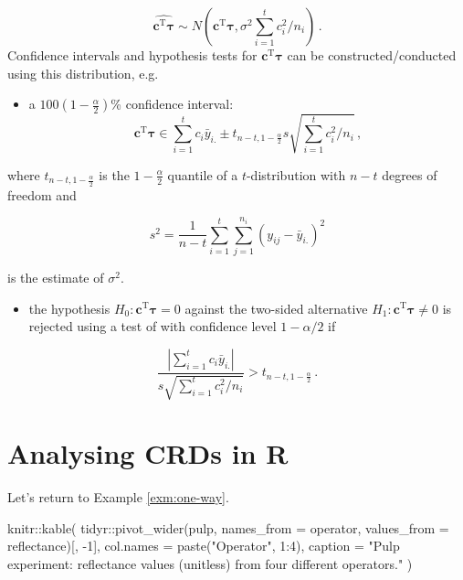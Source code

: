 \documentclass[
]{book}
\newenvironment{Shaded}{\begin{snugshade}}{\end{snugshade}}
\newcommand{\AttributeTok}[1]{\textcolor[rgb]{0.77,0.63,0.00}{#1}}
\newcommand{\DecValTok}[1]{\textcolor[rgb]{0.00,0.00,0.81}{#1}}
\newcommand{\FunctionTok}[1]{\textcolor[rgb]{0.00,0.00,0.00}{#1}}
\newcommand{\NormalTok}[1]{#1}
\newcommand{\SpecialCharTok}[1]{\textcolor[rgb]{0.00,0.00,0.00}{#1}}
\newcommand{\StringTok}[1]{\textcolor[rgb]{0.31,0.60,0.02}{#1}}
\providecommand{\tightlist}{%
  \setlength{\itemsep}{0pt}\setlength{\parskip}{0pt}}
\theoremstyle{definition}
\theoremstyle{definition}
\theoremstyle{definition}
\theoremstyle{definition}
\theoremstyle{remark}
\begin{document}
\[
\widehat{\boldsymbol{c}^{\mathrm{T}}\boldsymbol{\tau}} \sim N\left(\boldsymbol{c}^{\mathrm{T}}\boldsymbol{\tau}, \sigma^2\sum_{i=1}^tc_i^2/n_i\right)\,.
\]
Confidence intervals and hypothesis tests for \(\boldsymbol{c}^{\mathrm{T}}\boldsymbol{\tau}\) can be constructed/conducted using this distribution, e.g.

\begin{itemize}
\tightlist
\item
  a \(100(1-\frac{\alpha}{2})\)\% confidence interval:
  \[
   \boldsymbol{c}^{\mathrm{T}}\boldsymbol{\tau} \in \sum_{i=1}^tc_i\bar{y}_{i.} \pm t_{n-t, 1-\frac{\alpha}{2}}s\sqrt{\sum_{i=1}^tc_i^2/n_i}\,,
   \]
\end{itemize}

where \(t_{n-t, 1-\frac{\alpha}{2}}\) is the \(1-\frac{\alpha}{2}\) quantile of a \(t\)-distribution with \(n-t\) degrees of freedom and

\begin{equation} 
s^2 = \frac{1}{n-t}\sum_{i=1}^t\sum_{j=1}^{n_i}(y_{ij} - \bar{y}_{i.})^2
\label{eq:crd-s2}
\end{equation}

is the estimate of \(\sigma^2\).

\begin{itemize}
\tightlist
\item
  the hypothesis \(H_0: \boldsymbol{c}^{\mathrm{T}}\boldsymbol{\tau} = 0\) against the two-sided alternative \(H_1: \boldsymbol{c}^{\mathrm{T}}\boldsymbol{\tau} \ne 0\) is rejected using a test of with confidence level \(1-\alpha/2\) if
\end{itemize}

\[
 \frac{|\sum_{i=1}^tc_i\bar{y}_{i.}|}{s\sqrt{\sum_{i=1}^tc_i^2/n_i}} > t_{n-t, 1-\frac{\alpha}{2}}\,.
 \]

\hypertarget{r-crd}{%
\section{Analysing CRDs in R}\label{r-crd}}

Let's return to Example \ref{exm:one-way}.

\begin{Shaded}
\begin{Highlighting}[]
\NormalTok{knitr}\SpecialCharTok{::}\FunctionTok{kable}\NormalTok{(}
\NormalTok{ tidyr}\SpecialCharTok{::}\FunctionTok{pivot\_wider}\NormalTok{(pulp, }\AttributeTok{names\_from =}\NormalTok{ operator, }\AttributeTok{values\_from =}\NormalTok{ reflectance)[, }\SpecialCharTok{{-}}\DecValTok{1}\NormalTok{],}
 \AttributeTok{col.names =} \FunctionTok{paste}\NormalTok{(}\StringTok{"Operator"}\NormalTok{, }\DecValTok{1}\SpecialCharTok{:}\DecValTok{4}\NormalTok{),}
 \AttributeTok{caption =} \StringTok{"Pulp experiment: reflectance values (unitless) from four different operators."}
\NormalTok{)}
\end{Highlighting}
\end{Shaded}
\end{document}
